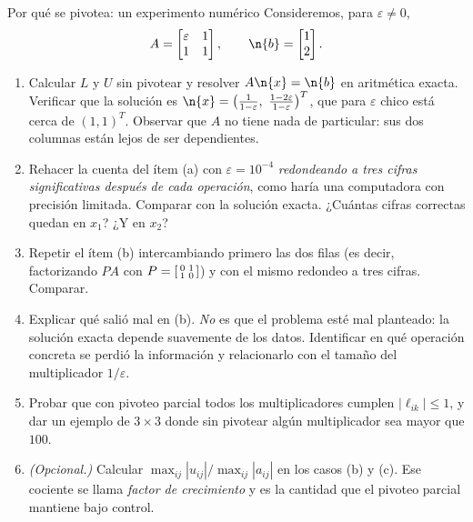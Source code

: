 \begin{entrega}{Por qué se pivotea: un experimento numérico}
Consideremos, para $\varepsilon\neq0$,
\[
A = \begin{bmatrix} \varepsilon & 1\\ 1 & 1\end{bmatrix},
\qquad
\n{b} = \begin{bmatrix} 1 \\ 2\end{bmatrix}.
\]

\begin{enumerate}[label=\textbf{(\alph*)},itemsep=3pt,topsep=4pt]
\item Calcular $L$ y $U$ sin pivotear y resolver $A\n{x}=\n{b}$ en aritmética
exacta. Verificar que la solución es
$\n{x} = \big(\tfrac{1}{1-\varepsilon},\ \tfrac{1-2\varepsilon}{1-\varepsilon}\big)^T$,
que para $\varepsilon$ chico está cerca de $(1,1)^T$. Observar que $A$ no tiene
nada de particular: sus dos columnas están lejos de ser dependientes.

\item Rehacer la cuenta del ítem (a) con $\varepsilon = 10^{-4}$
\emph{redondeando a tres cifras significativas después de cada operación}, como
haría una computadora con precisión limitada. Comparar con la solución exacta.
¿Cuántas cifras correctas quedan en $x_1$? ¿Y en $x_2$?

\item Repetir el ítem (b) intercambiando primero las dos filas (es decir,
factorizando $PA$ con $P = \begin{bsmallmatrix}0&1\\1&0\end{bsmallmatrix}$) y con
el mismo redondeo a tres cifras. Comparar.

\item Explicar qué salió mal en (b). \emph{No} es que el problema esté mal
planteado: la solución exacta depende suavemente de los datos. Identificar en
qué operación concreta se perdió la información y relacionarlo con el tamaño del
multiplicador $1/\varepsilon$.

\item Probar que con pivoteo parcial todos los multiplicadores cumplen
$|\ell_{ik}|\le1$, y dar un ejemplo de $3\times3$ donde sin pivotear algún
multiplicador sea mayor que $100$.

\item \emph{(Opcional.)} Calcular $\max_{ij}|u_{ij}| / \max_{ij}|a_{ij}|$ en los
casos (b) y (c). Ese cociente se llama \emph{factor de crecimiento} y es la
cantidad que el pivoteo parcial mantiene bajo control.
\end{enumerate}

\medskip
{}
\end{entrega}

